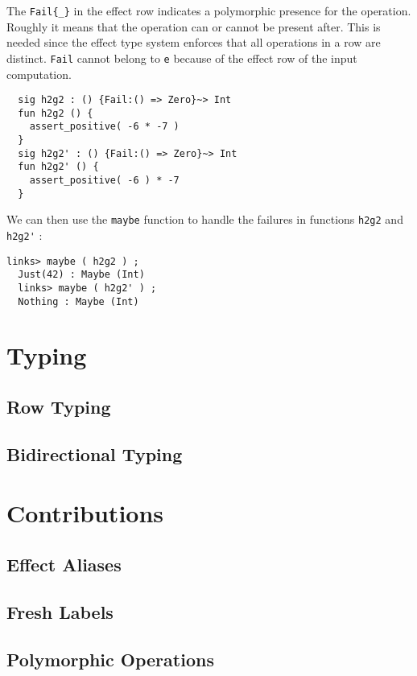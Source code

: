 \documentclass[nonacm=true, language=french, language=english]{acmart}
\begin{document}
The \verb|Fail{_}| in the effect row indicates a polymorphic presence for the operation. Roughly it means that the operation can or cannot be present after. This is needed since the effect type system enforces that all operations in a row are distinct. \verb|Fail| cannot belong to \verb|e| because of the effect row of the input computation.

\begin{lstlisting}
  sig h2g2 : () {Fail:() => Zero}~> Int
  fun h2g2 () {
    assert_positive( -6 * -7 )
  }
  sig h2g2' : () {Fail:() => Zero}~> Int
  fun h2g2' () {
    assert_positive( -6 ) * -7
  }
\end{lstlisting}

We can then use the \verb|maybe| function to handle the failures in functions \verb|h2g2| and \verb|h2g2'| :

\begin{lstlisting}[caption=Links console]
  links> maybe ( h2g2 ) ;
  Just(42) : Maybe (Int)
  links> maybe ( h2g2' ) ;
  Nothing : Maybe (Int)
\end{lstlisting}

\section{Typing}

\subsection{Row Typing}
\label{sec:row-typ}


\subsection{Bidirectional Typing}



\section{Contributions}

\subsection{Effect Aliases}

\subsection{Fresh Labels}

\subsection{Polymorphic Operations}
\end{document}
